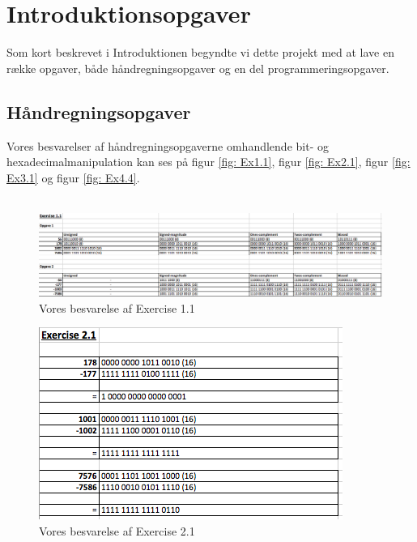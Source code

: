\chapter{Introduktionsopgaver}
Som kort beskrevet i Introduktionen begyndte vi dette projekt med at lave en række opgaver, både håndregningsopgaver og en del programmeringsopgaver.

\section{Håndregningsopgaver}
Vores besvarelser af håndregningsopgaverne omhandlende bit- og hexadecimalmanipulation kan ses på figur \ref{fig: Ex1.1}, figur \ref{fig: Ex2.1}, figur \ref{fig: Ex3.1} og figur \ref{fig: Ex4.4}.\\ \\


\begin{figure}[h!]
\centering
\includegraphics[scale=0.4]{figs/Ex1.png}
\caption{Vores besvarelse af Exercise 1.1}
\label{fig:Ex1.1}
\end{figure}

\begin{figure}[h!]
\centering
\includegraphics[scale=0.6]{figs/Ex2.png}
\caption{Vores besvarelse af Exercise 2.1}
\label{fig:Ex2.1}
\end{figure}

